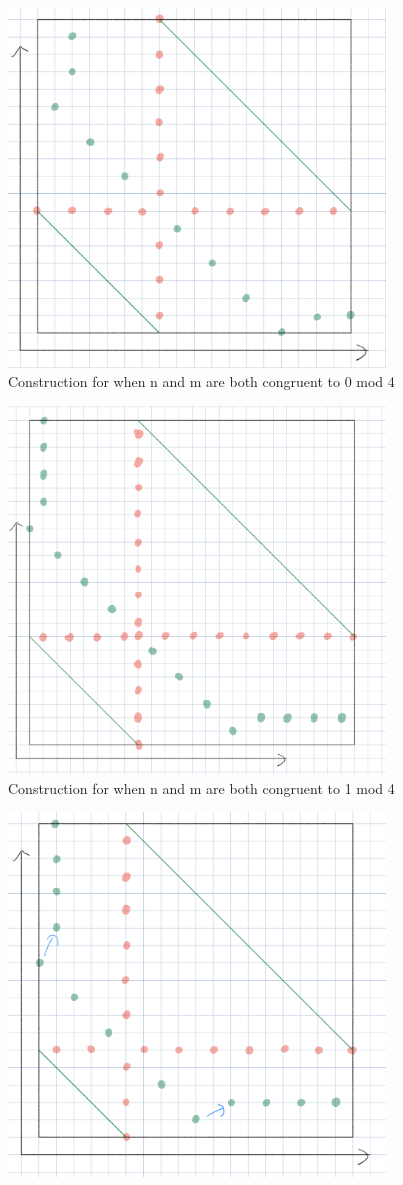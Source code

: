 \documentclass[10pt]{../usamts}
\begin{document}
\begin{solution}
\begin{figure}[h!]
    \includegraphics[width=10cm]{round2/p5construct/construct_8_12.png}
    \caption{Construction for when n and m are both congruent to 0 mod 4}
\end{figure}
\begin{figure}[h!]
    \includegraphics[width=10cm]{round2/p5construct/construct_9_17.png}
    \caption{Construction for when n and m are both congruent to 1 mod 4}
\end{figure}
\begin{figure}[h!]
    \includegraphics[width=10cm]{round2/p5construct/construct_6_14.png}

\end{figure}
\end{solution}
\end{document}
